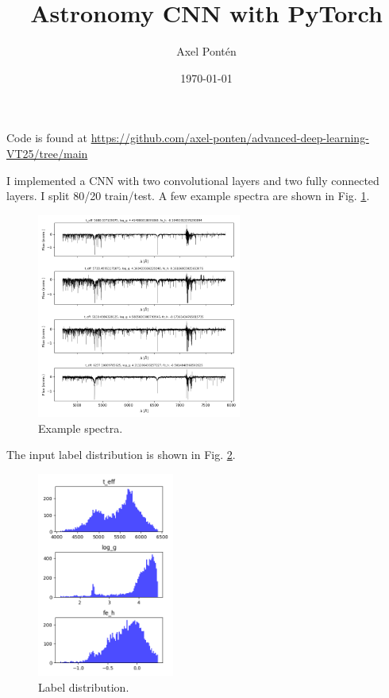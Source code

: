 \documentclass[12pt, a4paper]{article}
\title{Astronomy CNN with PyTorch}
\author{Axel Pontén}
\date{\today}
\begin{document}
\maketitle

Code is found at \url{https://github.com/axel-ponten/advanced-deep-learning-VT25/tree/main}

I implemented a CNN with two convolutional layers and two fully connected layers. I split 80/20 train/test. A few example spectra are shown in Fig. \ref{fig:spectra}.

\begin{figure}[!h]
    \centering
    \includegraphics[width=0.6\textwidth]{../plots/spectra.png}
    \caption{Example spectra.}
    \label{fig:spectra}
\end{figure}


The input label distribution is shown in Fig. \ref{fig:label_dist}.
\begin{figure}[!h]
    \centering
    \includegraphics[width=0.4\textwidth]{../plots/normalize_target/labels.png}
    \caption{Label distribution.}
    \label{fig:label_dist}
\end{figure}
\end{document}
